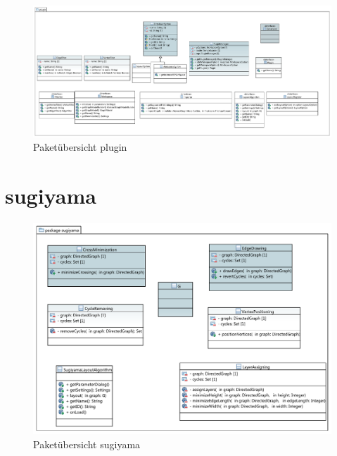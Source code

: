 \begin{figure}[hb]
  \centering
  \includegraphics[width=380pt]{resourcen/plugin.pdf}
  \caption{Paketübersicht plugin}
  \label{fig:packge_plugin}
\end{figure}

\newpage

\section{sugiyama}

\begin{figure}[hb]
  \centering
  \includegraphics[width=380pt]{resourcen/sugiyama.pdf}
  \caption{Paketübersicht sugiyama}
  \label{fig:packge_sugiyama}
\end{figure}


